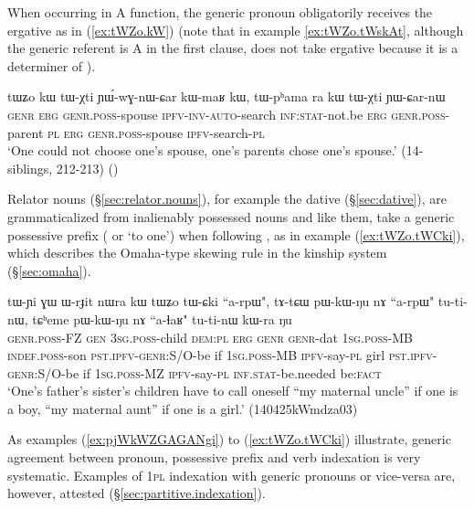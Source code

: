 When occurring in A function, the generic pronoun  obligatorily receives the ergative  as in (\ref{ex:tWZo.kW}) (note that in example \ref{ex:tWZo.tWskAt}, although the generic referent is A in the first clause,  does not take ergative because it is a determiner of ). 

\begin{exe}
\ex \label{ex:tWZo.kW}
\gll tɯʑo kɯ tɯ-χti ɲɯ́-wɣ-nɯ-ɕar kɯ-maʁ kɯ,  tɯ-pʰama ra kɯ tɯ-χti ɲɯ-ɕar-nɯ \\
\textsc{genr} \textsc{erg} \textsc{genr}.\textsc{poss}-spouse \textsc{ipfv}-\textsc{inv}-\textsc{auto}-search \textsc{inf}:\textsc{stat}-not.be \textsc{erg} \textsc{genr}.\textsc{poss}-parent \textsc{pl} \textsc{erg} \textsc{genr}.\textsc{poss}-spouse \textsc{ipfv}-search-\textsc{pl}  \\
\glt `One could not choose one's spouse, one's parents chose one's spouse.' (14-siblings, 212-213)
()
\end{exe} 

Relator nouns (§\ref{sec:relator.nouns}), for example the dative  (§\ref{sec:dative}),  are grammaticalized from inalienably possessed nouns and like them, take a generic possessive prefix ( or  `to one') when following , as in example (\ref{ex:tWZo.tWCki}), which describes the Omaha-type skewing rule in the kinship system (§\ref{sec:omaha}).

\begin{exe}
\ex \label{ex:tWZo.tWCki}
\gll
tɯ-ɲi ɣɯ ɯ-rɟit nɯra kɯ tɯʑo tɯ-ɕki ``a-rpɯ", tɤ-tɕɯ pɯ-kɯ-ŋu nɤ ``a-rpɯ" tu-ti-nɯ, tɕʰeme pɯ-kɯ-ŋu nɤ ``a-ɬaʁ" tu-ti-nɯ kɯ-ra ŋu \\
\textsc{genr}.\textsc{poss}-FZ \textsc{gen} \textsc{3sg}.\textsc{poss}-child \textsc{dem}:\textsc{pl} \textsc{erg} \textsc{genr} \textsc{genr}-dat \textsc{1sg}.\textsc{poss}-MB \textsc{indef}.\textsc{poss}-son \textsc{pst}.\textsc{ipfv}-\textsc{genr}:S/O-be if \textsc{1sg}.\textsc{poss}-MB \textsc{ipfv}-say-\textsc{pl} girl \textsc{pst}.\textsc{ipfv}-\textsc{genr}:S/O-be  if \textsc{1sg}.\textsc{poss}-MZ \textsc{ipfv}-say-\textsc{pl} \textsc{inf}.\textsc{stat}-be.needed be:\textsc{fact} \\
\glt `One's father's sister's children have to call oneself ``my maternal uncle'' if one is a boy, ``my maternal aunt'' if one is a girl.'  (140425kWmdza03)
\end{exe} 

As examples (\ref{ex:pjWkWZGAGANgi}) to (\ref{ex:tWZo.tWCki}) illustrate, generic agreement between pronoun, possessive prefix and verb indexation is very systematic. Examples of \textsc{1pl} indexation with generic pronouns or vice-versa are, however, attested (§\ref{sec:partitive.indexation}).

